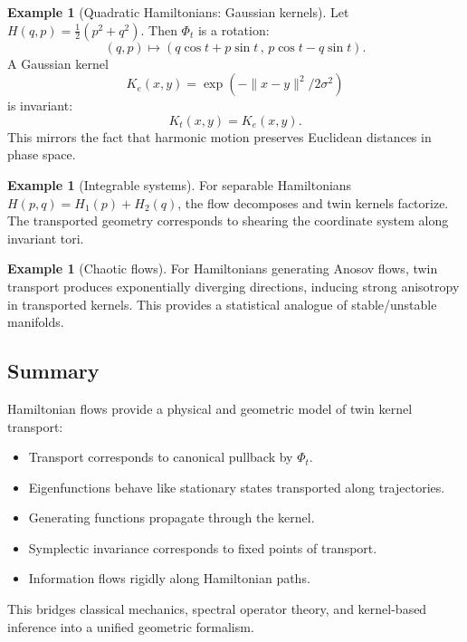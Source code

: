 \documentclass[11pt]{article}
\theoremstyle{definition}
\newtheorem{example}[theorem]{Example}
\begin{document}
\begin{example}[Quadratic Hamiltonians: Gaussian kernels]
	Let $H(q,p)=\frac12(p^2+q^2)$.
	Then $\Phi_t$ is a rotation:
	\[
	(q,p)\mapsto (q\cos t + p\sin t\, ,\, p\cos t - q\sin t).
	\]
	A Gaussian kernel
	\[
	K_e(x,y)=\exp(-\|x-y\|^2/2\sigma^2)
	\]
	is invariant:
	\[
	K_t(x,y)=K_e(x,y).
	\]
	This mirrors the fact that harmonic motion preserves Euclidean distances in phase space.
\end{example}

\begin{example}[Integrable systems]
	For separable Hamiltonians $H(p,q)=H_1(p)+H_2(q)$, the flow decomposes and twin kernels factorize.
	The transported geometry corresponds to shearing the coordinate system along invariant tori.
\end{example}

\begin{example}[Chaotic flows]
	For Hamiltonians generating Anosov flows, twin transport produces exponentially diverging directions, inducing strong anisotropy in transported kernels.
	This provides a statistical analogue of stable/unstable manifolds.
\end{example}

\subsection{Summary}

Hamiltonian flows provide a physical and geometric model of twin kernel transport:
\begin{itemize}[itemsep=3pt]
	\item Transport corresponds to canonical pullback by $\Phi_t$.
	\item Eigenfunctions behave like stationary states transported along trajectories.
	\item Generating functions propagate through the kernel.
	\item Symplectic invariance corresponds to fixed points of transport.
	\item Information flows rigidly along Hamiltonian paths.
\end{itemize}

This bridges classical mechanics, spectral operator theory, and kernel-based inference into a unified geometric formalism.

	
\end{document}
